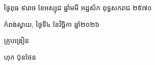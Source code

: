 \documentclass[a4paper,10pt]{article}
\begin{document}
\vspace{6pt}
{\centering
\hspace*{5.2cm}\begin{minipage}{11.5cm}
  \centering
  ថ្ងៃពុធ ៩រោច ខែអស្សុជ ឆ្នាំមមី អដ្ឋស័ក ពុទ្ធសករាជ ២៥៧០\par
  កំពង់ស្វាយ, ថ្ងៃទី៤ ខែវិច្ឆិកា ឆ្នាំ២០២៦\par
  \vspace{2pt}
  {\muol គ្រូបង្រៀន\par}
  \vspace{32pt}
  \hfill{\muol ហុក ប៊ុនថែន}\hspace*{1.4cm}
\end{minipage}\par}
\end{document}
